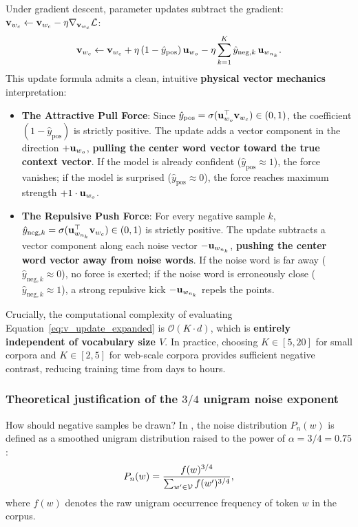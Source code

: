 \documentclass[../../main.tex]{subfiles}
\begin{document}
Under gradient descent, parameter updates subtract the gradient: $\mathbf{v}_{w_c} \leftarrow \mathbf{v}_{w_c} - \eta \nabla_{\mathbf{v}_{w_c}} \mathcal{L}$:
\begin{equation}
\label{eq:v_update_expanded}
\mathbf{v}_{w_c} \leftarrow \mathbf{v}_{w_c} + \eta \left( 1 - \hat{y}_{\text{pos}} \right) \mathbf{u}_{w_o} - \eta \sum_{k=1}^K \hat{y}_{\text{neg}, k} \, \mathbf{u}_{w_{n_k}}.
\end{equation}
This update formula admits a clean, intuitive \textbf{physical vector mechanics} interpretation:
\begin{itemize}
    \item \textbf{The Attractive Pull Force}: Since $\hat{y}_{\text{pos}} = \sigma(\mathbf{u}_{w_o}^\top \mathbf{v}_{w_c}) \in (0, 1)$, the coefficient $(1 - \hat{y}_{\text{pos}})$ is strictly positive. The update adds a vector component in the direction $+\mathbf{u}_{w_o}$, \textbf{pulling the center word vector toward the true context vector}. If the model is already confident ($\hat{y}_{\text{pos}} \approx 1$), the force vanishes; if the model is surprised ($\hat{y}_{\text{pos}} \approx 0$), the force reaches maximum strength $+1 \cdot \mathbf{u}_{w_o}$.
    \item \textbf{The Repulsive Push Force}: For every negative sample $k$, $\hat{y}_{\text{neg}, k} = \sigma(\mathbf{u}_{w_{n_k}}^\top \mathbf{v}_{w_c}) \in (0, 1)$ is strictly positive. The update subtracts a vector component along each noise vector $-\mathbf{u}_{w_{n_k}}$, \textbf{pushing the center word vector away from noise words}. If the noise word is far away ($\hat{y}_{\text{neg}, k} \approx 0$), no force is exerted; if the noise word is erroneously close ($\hat{y}_{\text{neg}, k} \approx 1$), a strong repulsive kick $-\mathbf{u}_{w_{n_k}}$ repels the points.
\end{itemize}

Crucially, the computational complexity of evaluating Equation~\eqref{eq:v_update_expanded} is $\mathcal{O}(K \cdot d)$, which is \textbf{entirely independent of vocabulary size $V$}. In practice, choosing $K \in [5, 20]$ for small corpora and $K \in [2, 5]$ for web-scale corpora provides sufficient negative contrast, reducing training time from days to hours.

\subsubsection{Theoretical justification of the \texorpdfstring{$3/4$}{3/4} unigram noise exponent}
\label{subsec:unigram_three_quarters}

How should negative samples be drawn? In \cite{mikolov2013distributed}, the noise distribution $P_n(w)$ is defined as a smoothed unigram distribution raised to the power of $\alpha = 3/4 = 0.75$:
\begin{equation}
\label{eq:unigram_three_quarters}
P_n(w) = \frac{f(w)^{3/4}}{\sum_{w' \in \mathcal{V}} f(w')^{3/4}},
\end{equation}
where $f(w)$ denotes the raw unigram occurrence frequency of token $w$ in the corpus.
\end{document}
